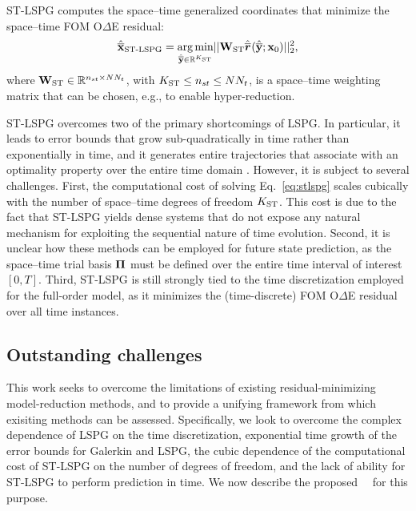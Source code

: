 \documentclass[3p,computermodern,10pt]{elsarticle}
\begin{document}
ST-LSPG computes the space--time generalized coordinates that
minimize the space--time FOM O$\Delta$E residual:
\begin{equation}\label{eq:stlspg}
	\hat{\mathbf{\overline{x}}}_\text{ST-LSPG} = \underset{ \hat{\mathbf{\overline{y}}}\in\mathbb{R}^{K_{\text{ST}}} }{\text{arg\,min}}|| \mathbf{W}_{\text{ST}}  \hat{\overline{\boldsymbol r}}_{\text{}}(\hat{\mathbf{\overline{y}}};{{\mathbf{x}}_0}) ||_2^2, 
\end{equation}
where $\mathbf{W}_{\text{ST}} \in \mathbb{R}^{n_{st} \times N N_t}$, with $K_{\text{ST}}
\le n_{st} \le N N_t$, is a space--time weighting matrix that can be chosen,
e.g., to enable hyper-reduction.

ST-LSPG overcomes two of the primary shortcomings of LSPG. In particular, it
leads to error bounds that grow sub-quadratically in time rather than
exponentially in time, and it generates entire trajectories that associate
with an optimality property over the entire time domain \cite{choi_stlspg}.
However, it is subject to several challenges. First, the computational cost of
solving Eq.~\eqref{eq:stlspg} scales cubically with the number of space--time
degrees of freedom $K_{\text{ST}}$. This cost is due to the fact that ST-LSPG yields 
dense systems that do not expose any natural mechanism for exploiting
the sequential nature of time evolution. Second, it is unclear how these
methods can be employed for future state prediction, as the space--time trial
basis $\boldsymbol \Pi$ must be defined over the entire time interval of interest
$[0,T]$. Third, ST-LSPG is still strongly tied to the time discretization
employed for the full-order model, as it minimizes the (time-discrete) FOM
O$\Delta$E residual over all time instances.
  
\subsection{Outstanding challenges}
This work seeks to overcome the limitations of existing residual-minimizing
model-reduction methods, and to provide a unifying framework from which
exisiting methods can be assessed. Specifically, we look to overcome the
complex dependence of LSPG on the time discretization,
exponential time growth of the error bounds for Galerkin and LSPG,
the cubic dependence of the computational cost of ST-LSPG on the number of
degrees of freedom, and the lack of ability for ST-LSPG to perform prediction
in time. We now describe the proposed \methodNameLower\ \approachKwd\ for this
purpose. 
%
\end{document}
